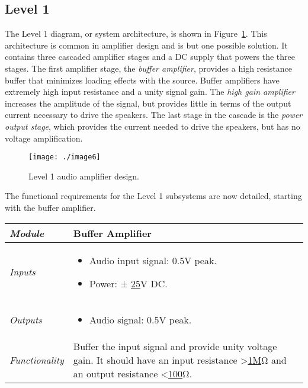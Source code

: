\subsection*{Level 1}
\label{subsection:level-1}

The Level 1 diagram, or system architecture, is shown in 
Figure~\ref{figure:level1PowerAmp}.
This architecture is common in amplifier design and is but one possible
solution. It contains three cascaded amplifier stages and a DC supply
that powers the three stages. The first amplifier stage, the
\emph{buffer amplifier}, provides a high resistance buffer that
minimizes loading effects with the source. Buffer amplifiers have
extremely high input resistance and a unity signal gain. The \emph{high
gain amplifier} increases the amplitude of the signal, but provides
little in terms of the output current necessary to drive the speakers.
The last stage in the cascade is the \emph{power output stage}, which
provides the current needed to drive the speakers, but has no voltage
amplification.

\begin{figure}
\texttt{[image: ./image6]}
\caption{Level 1 audio amplifier design.}
\label{figure:level1PowerAmp}
\end{figure}



The functional requirements for the Level 1 subsystems are now detailed,
starting with the buffer amplifier.

\begin{table}
\label{table:level1BufferAmplifier}
\begin{tabular}{|l|m{10cm}|}
\hline
\emph{Module} &
Buffer Amplifier \\ \hline
\emph{Inputs} & 
\begin{itemize}
\item
  Audio input signal: 0.5V peak.
\item
  Power: ± \ul{25}V DC.
\end{itemize}\\ \hline

\emph{Outputs} & 
\begin{itemize}
\item
  Audio signal: 0.5V peak.
\end{itemize}   \\ \hline
\emph{Functionality} & Buffer the input signal and provide unity voltage
gain. It should have an input resistance \textgreater{}\ul{1M}Ω and an
output resistance \textless{}\ul{100}Ω. \\ \hline
\end{tabular}
\end{table}

